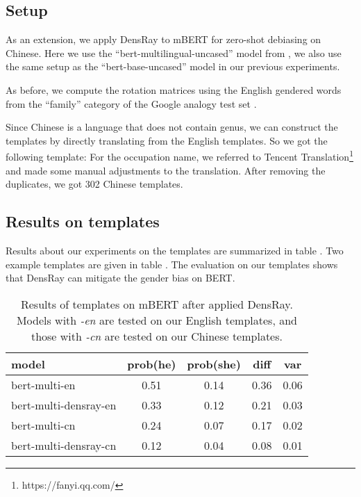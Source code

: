 \subsection{Setup}
As an extension, we apply DensRay to mBERT for zero-shot debiasing on Chinese. Here we use the ``bert-multilingual-uncased'' model from \citep{wolf2019huggingfaces}, we also use the same setup as the ``bert-base-uncased'' model in our previous experiments.

As before, we compute the rotation matrices using the English gendered words from the ``family'' category of the Google analogy test set \citep{mikolov2013efficient}.

Since Chinese is a language that does not contain genus, we can construct the templates by directly translating from the English templates. So we got the following template:  For the occupation name, we referred to Tencent Translation\footnote{https://fanyi.qq.com/} and made some manual adjustments to the translation. After removing the duplicates, we got 302 Chinese templates.

\subsection{Results on templates}
Results about our experiments on the templates are summarized in table . Two example templates are given in table . The evaluation on our templates shows that DensRay can mitigate the gender bias on BERT.
\begin{table}[ht]
\centering
\footnotesize
\begin{tabular}{lcccc}
\hline
model & prob(he) & prob(she) & diff & var\\
\hline
\scriptsize bert-multi-en 
& 0.51 & 0.14 & 0.36 & 0.06 \\
\scriptsize 
bert-multi-densray-en & 0.33 & 0.12 & 0.21 & 0.03 \\
\scriptsize bert-multi-cn 
& 0.24 & 0.07 & 0.17 & 0.02 \\
\scriptsize bert-multi-densray-cn 
& 0.12 & 0.04 & 0.08 & 0.01\\
\hline
\end{tabular}
\caption{
Results of templates on mBERT after applied DensRay. Models with \textit{-en} are tested on our English templates, and those with \textit{-cn} are tested on our Chinese templates.}
\end{table}

